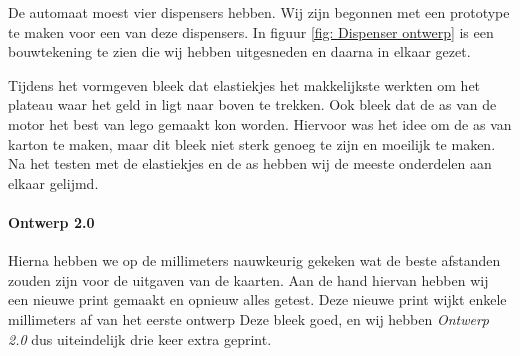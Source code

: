 \documentclass{article}
\begin{document}
De automaat moest vier dispensers hebben.
Wij zijn begonnen met een prototype te maken voor een van deze dispensers.
In figuur \ref{fig: Dispenser ontwerp} is een bouwtekening te zien die wij hebben uitgesneden en daarna in elkaar gezet.

Tijdens het vormgeven bleek dat elastiekjes het makkelijkste werkten om het plateau waar het geld in ligt naar boven te trekken.
Ook bleek dat de as van de motor het best van lego gemaakt kon worden.
Hiervoor was het idee om de as van karton te maken, maar dit bleek niet sterk genoeg te zijn en moeilijk te maken.
Na het testen met de elastiekjes en de as hebben wij de meeste onderdelen aan elkaar gelijmd.

\paragraph{Ontwerp 2.0}

Hierna hebben we op de millimeters nauwkeurig gekeken wat de beste afstanden zouden zijn voor de uitgaven van de kaarten.
Aan de hand hiervan hebben wij een nieuwe print gemaakt en opnieuw alles getest.
Deze nieuwe print wijkt enkele millimeters af van het eerste ontwerp
Deze bleek goed, en wij hebben \emph{Ontwerp 2.0} dus uiteindelijk drie keer extra geprint.
\end{document}
